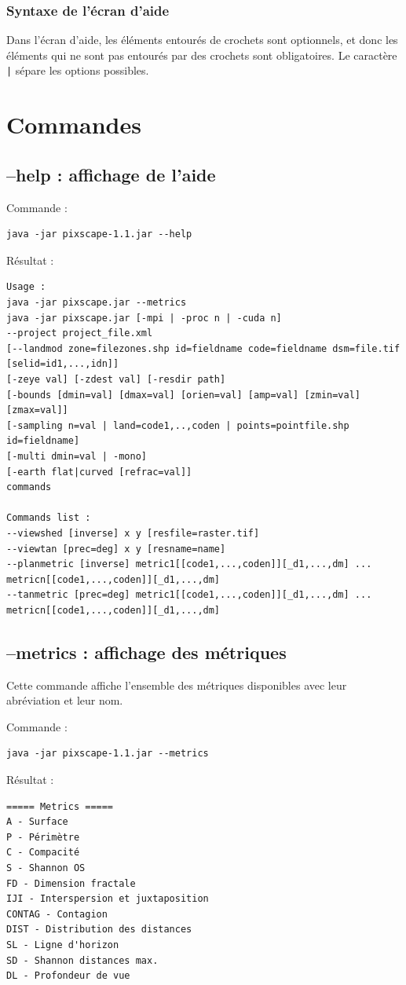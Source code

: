 \documentclass{report}
\begin{document}
\subsubsection{Syntaxe de l'écran d'aide}
Dans l'écran d'aide, les éléments entourés de crochets sont optionnels, et donc les éléments qui ne sont pas entourés par des crochets sont obligatoires. Le caractère \verb+|+ sépare les options possibles.

\section{Commandes}

\subsection{--help : affichage de l'aide}
Commande :
\begin{Verbatim}
java -jar pixscape-1.1.jar --help
\end{Verbatim}
Résultat :
\begin{Verbatim}
Usage :
java -jar pixscape.jar --metrics
java -jar pixscape.jar [-mpi | -proc n | -cuda n]
--project project_file.xml
[--landmod zone=filezones.shp id=fieldname code=fieldname dsm=file.tif [selid=id1,...,idn]]
[-zeye val] [-zdest val] [-resdir path]
[-bounds [dmin=val] [dmax=val] [orien=val] [amp=val] [zmin=val] [zmax=val]]
[-sampling n=val | land=code1,..,coden | points=pointfile.shp id=fieldname]
[-multi dmin=val | -mono]
[-earth flat|curved [refrac=val]]
commands

Commands list :
--viewshed [inverse] x y [resfile=raster.tif]
--viewtan [prec=deg] x y [resname=name]
--planmetric [inverse] metric1[[code1,...,coden]][_d1,...,dm] ... metricn[[code1,...,coden]][_d1,...,dm]
--tanmetric [prec=deg] metric1[[code1,...,coden]][_d1,...,dm] ... metricn[[code1,...,coden]][_d1,...,dm]
\end{Verbatim}

\subsection{--metrics : affichage des métriques}
Cette commande affiche l'ensemble des métriques disponibles avec leur abréviation et leur nom. 

Commande :
\begin{Verbatim}
java -jar pixscape-1.1.jar --metrics
\end{Verbatim}
Résultat :
\begin{Verbatim}
===== Metrics =====
A - Surface
P - Périmètre
C - Compacité
S - Shannon OS
FD - Dimension fractale
IJI - Interspersion et juxtaposition
CONTAG - Contagion
DIST - Distribution des distances
SL - Ligne d'horizon
SD - Shannon distances max.
DL - Profondeur de vue
\end{Verbatim}
\end{document}
